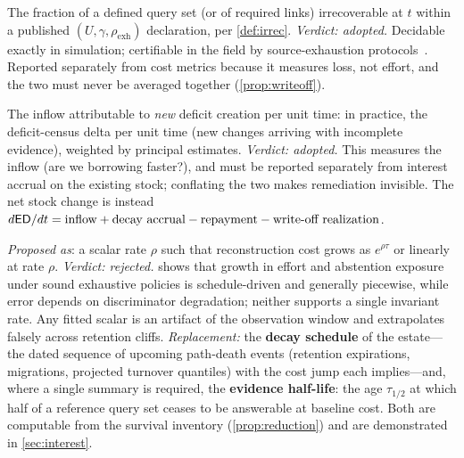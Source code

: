 \begin{metricdef}
\label{met:irr}
The fraction of a defined query set (or of required links) irrecoverable at $t$
within a published $(U,\gamma,\rho_{\mathrm{exh}})$ declaration, per
\cref{def:irrec}. \emph{Verdict: adopted.} Decidable exactly in simulation;
certifiable in the field by source-exhaustion protocols~\cite{nist80086}. Reported
separately from cost metrics because it measures loss, not effort, and the two must
never be averaged together (\cref{prop:writeoff}).
\end{metricdef}

\begin{metricdef}
\label{met:growth}
The inflow attributable to \emph{new} deficit creation per unit time:
in practice, the deficit-census delta per unit time (new changes arriving with
incomplete evidence), weighted by principal estimates. \emph{Verdict: adopted.}
This measures the inflow (are we borrowing faster?), and must
be reported separately from interest accrual on the existing stock; conflating the
two makes remediation invisible. The net stock change is instead
$d\mathsf{ED}/dt=\text{inflow}+\text{decay accrual}-\text{repayment}
-\text{write-off realization}$.
\end{metricdef}

\begin{metricdef}
\label{met:interest}
\emph{Proposed as}: a scalar rate $\rho$ such that reconstruction cost grows as
$e^{\rho\tau}$ or linearly at rate $\rho$. \emph{Verdict: rejected.}
 shows that growth in effort and abstention exposure under sound
exhaustive policies is schedule-driven and generally
piecewise, while error depends on discriminator degradation; neither supports a
single invariant rate. Any fitted scalar is an artifact of the observation window and
extrapolates falsely across retention cliffs. \emph{Replacement:} the
\textbf{decay schedule} of the estate---the dated sequence of upcoming path-death
events (retention expirations, migrations, projected turnover quantiles) with the
cost jump each implies---and, where a single summary is required, the
\textbf{evidence half-life}: the age $\tau_{1/2}$ at which half of a reference
query set ceases to be answerable at baseline cost. Both are computable from the
survival inventory (\cref{prop:reduction}) and are demonstrated in
\cref{sec:interest}.
\end{metricdef}

